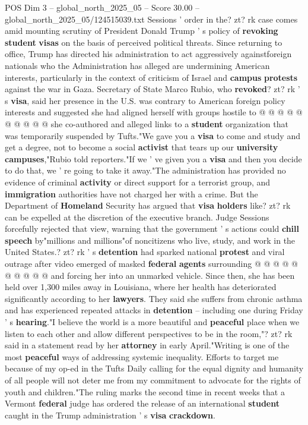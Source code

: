 \begin{textsample}{POS Dim 3 – global\_north\_2025\_05 – Score 30.00 – global\_north\_2025\_05/124515039.txt}
Sessions ' order in the? zt? rk case comes amid mounting scrutiny of President Donald Trump ' s policy of \textbf{revoking} \textbf{student} \textbf{visas} on the basis of perceived political threats.
Since returning to office, Trump has directed his administration to act aggressively againstforeign nationals who the Administration has alleged are undermining American interests, particularly in the context of criticism of Israel and \textbf{campus} \textbf{protests} against the war in Gaza.
Secretary of State Marco Rubio, who \textbf{revoked}? zt? rk ' s \textbf{visa}, said her presence in the U.S. was contrary to American foreign policy interests and suggested she had aligned herself with groups hostile to @ @ @ @ @ @ @ @ @ @ she co-authored and alleged links to a \textbf{student} organization that was temporarily suspended by Tufts."We gave you a \textbf{visa} to come and study and get a degree, not to become a social \textbf{activist} that tears up our \textbf{university} \textbf{campuses},"Rubio told reporters."If we ' ve given you a \textbf{visa} and then you decide to do that, we ' re going to take it away."The administration has provided no evidence of criminal \textbf{activity} or direct support for a terrorist group, and \textbf{immigration} authorities have not charged her with a crime.
But the Department of \textbf{Homeland} Security has argued that \textbf{visa} \textbf{holders} like? zt? rk can be expelled at the discretion of the executive branch.
Judge Sessions forcefully rejected that view, warning that the government ' s actions could \textbf{chill} \textbf{speech} by"millions and millions"of noncitizens who live, study, and work in the United States.? zt? rk ' s \textbf{detention} had sparked national \textbf{protest} and viral outrage after video emerged of masked \textbf{federal} \textbf{agents} surrounding @ @ @ @ @ @ @ @ @ @ and forcing her into an unmarked vehicle.
Since then, she has been held over 1,300 miles away in Louisiana, where her health has deteriorated significantly according to her \textbf{lawyers}.
They said she suffers from chronic asthma and has experienced repeated attacks in \textbf{detention} -- including one during Friday ' s \textbf{hearing}."I believe the world is a more beautiful and \textbf{peaceful} place when we listen to each other and allow different perspectives to be in the room,"? zt? rk said in a statement read by her \textbf{attorney} in early April."Writing is one of the most \textbf{peaceful} ways of addressing systemic inequality.
Efforts to target me because of my op-ed in the Tufts Daily calling for the equal dignity and humanity of all people will not deter me from my commitment to advocate for the rights of youth and children."The ruling marks the second time in recent weeks that a Vermont \textbf{federal} judge has ordered the release of an international \textbf{student} caught in the Trump administration ' s \textbf{visa} \textbf{crackdown}.

\end{textsample}
